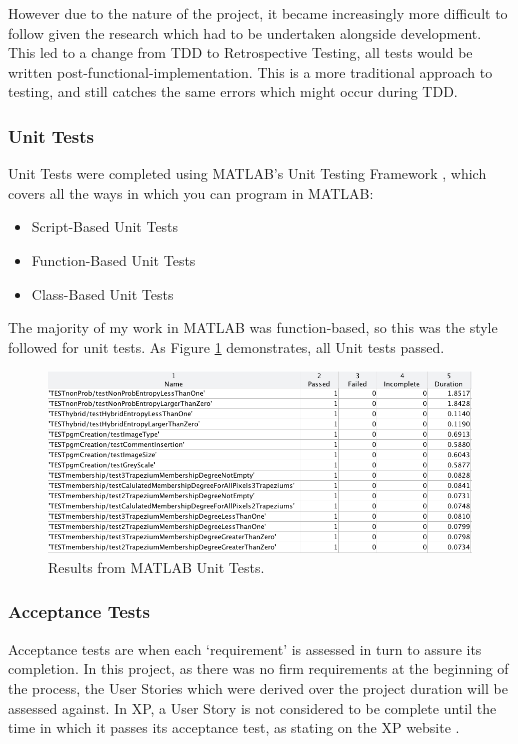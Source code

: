 However due to the nature of the project, it became increasingly more difficult to follow given the research which had to be undertaken alongside development. This led to a change from \acrshort{TDD} to Retrospective Testing, all tests would be written post-functional-implementation. This is a more traditional approach to testing, and still catches the same errors which might occur during \acrshort{TDD}.

\subsubsection{Unit Tests}

Unit Tests were completed using MATLAB's Unit Testing Framework \cite{testing}, which covers all the ways in which you can program in MATLAB:

\begin{itemize}
  \item Script-Based Unit Tests
  \item Function-Based Unit Tests
  \item Class-Based Unit Tests
  \end{itemize}

The majority of my work in MATLAB was function-based, so this was the style followed for unit tests. As Figure \ref{fig:unit-test-results} demonstrates, all Unit tests passed.

\begin{figure}[H]
  \centering
  \includegraphics[width=\textwidth]{Chapter2/software-img/test-results.png}
  \caption{Results from MATLAB Unit Tests.}
  \label{fig:unit-test-results}
\end{figure}

\subsubsection{Acceptance Tests}

Acceptance tests are when each `requirement' is assessed in turn to assure its completion. In this project, as there was no firm requirements at the beginning of the process, the User Stories which were derived over the project duration will be assessed against. In \acrfull{XP}, a User Story is not considered to be complete until the time in which it passes its acceptance test, as stating on the \acrshort{XP} website \cite{Acceptance_Tests}.

